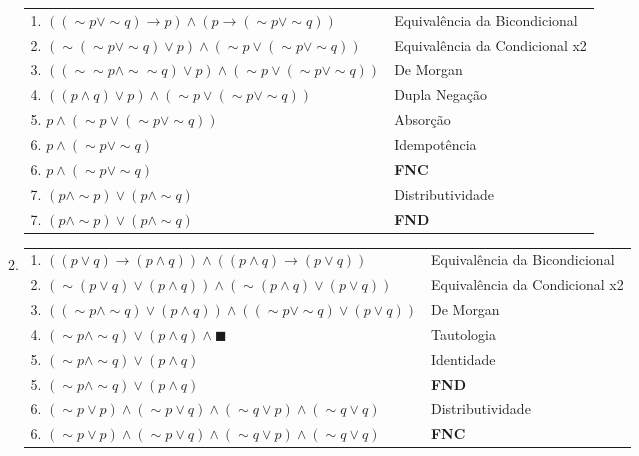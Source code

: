 \documentclass[12pt, a4paper,final]{article}
\begin{document}
\begin{enumerate}
\begin{enumerate}[label=(\alph*), leftmargin = 5mm]
                \begin{tabular}{ll}
                    1. $((\sim p \vee \sim q) \rightarrow p) \wedge (p \rightarrow (\sim p \vee \sim q))$ & Equivalência da Bicondicional \\
                    2. $(\sim(\sim p \vee \sim q) \vee p) \wedge (\sim p \vee (\sim p \vee \sim q))$ & Equivalência da Condicional x2 \\
                    3. $((\sim \sim p \wedge \sim \sim q) \vee p) \wedge (\sim p \vee (\sim p \vee \sim q))$ & De Morgan \\
                    4. $((p \wedge q) \vee p) \wedge (\sim p \vee (\sim p \vee \sim q))$ & Dupla Negação \\
                    5. $p \wedge (\sim p \vee (\sim p \vee \sim q))$ & Absorção \\
                    6. $p \wedge (\sim p \vee \sim q)$ & Idempotência \\
                    6. $p \wedge (\sim p \vee \sim q)$ & \textbf{FNC} \\
                    7. $(p \wedge \sim p) \vee (p \wedge \sim q)$ & Distributividade \\
                    7. $(p \wedge \sim p) \vee (p \wedge \sim q)$ & \textbf{FND} \\
                \end{tabular}
            
            \item 
                \begin{tabular}{ll}
                    1. $((p \vee q) \rightarrow (p \wedge q)) \wedge ((p \wedge q) \rightarrow (p \vee q))$ & Equivalência da Bicondicional \\
                    2. $(\sim (p \vee q) \vee (p \wedge q)) \wedge (\sim(p \wedge q) \vee (p \vee q))$ & Equivalência da Condicional x2 \\
                    3. $((\sim p \wedge \sim q) \vee (p \wedge q)) \wedge ((\sim p \vee \sim q) \vee (p \vee q))$ & De Morgan \\
                    4. $(\sim p \wedge \sim q) \vee (p \wedge q) \wedge \blacksquare $ & Tautologia \\
                    5. $(\sim p \wedge \sim q) \vee (p \wedge q)$ & Identidade \\
                    5. $(\sim p \wedge \sim q) \vee (p \wedge q)$ & \textbf{FND} \\
                    6. $(\sim p \vee p) \wedge (\sim p \vee q) \wedge (\sim q \vee p) \wedge (\sim q \vee q)$ & Distributividade \\
                    6. $(\sim p \vee p) \wedge (\sim p \vee q) \wedge (\sim q \vee p) \wedge (\sim q \vee q)$ & \textbf{FNC} \\
                \end{tabular}
        \end{enumerate}
        
        
        
    \end{enumerate}
\end{document}

